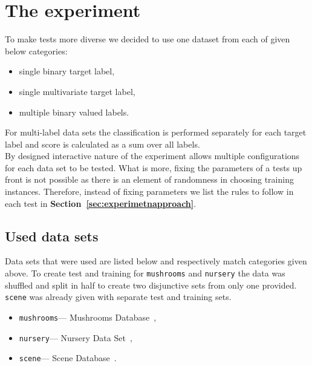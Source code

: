 \documentclass[12pt, a4paper, pdflatex]{report}
\begin{document}
\section{The experiment}
To make tests more diverse we decided to use one dataset from each of given below categories:
\begin{itemize}
\item single binary target label,
\item single multivariate target label,%
\item multiple binary valued labels.
\end{itemize}
For multi-label data sets the classification is performed separately for each target label and score is calculated as a sum over all labels.\\
By designed interactive nature of the experiment allows multiple configurations for each data set to be tested. What is more, fixing the parameters of a tests up front is not possible as there is an element of randomness in choosing training instances. Therefore, instead of fixing parameters we list the rules to follow in each test in \textbf{Section~\ref{sec:experimetnapproach}}.

\subsection{Used data sets}
Data sets that were used are listed below and respectively match categories given above. To create test and training for \texttt{mushrooms} and \texttt{nursery} the data was shuffled and split in half to create two disjunctive sets from only one provided. \texttt{scene} was already given with separate test and training sets.
\begin{itemize}
\item \texttt{mushrooms}--- Mushrooms Database~\cite{mushroomsDS},
\item \texttt{nursery}--- Nursery Data Set~\cite{nurseryDS},
\item \texttt{scene}--- Scene Database~\cite{sceneDS}.
\end{itemize}
\end{document}

